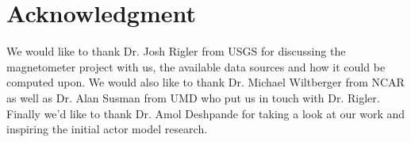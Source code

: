 \documentclass[conference]{IEEEtran}
\begin{document}
\section*{Acknowledgment}
We would like to thank Dr. Josh Rigler from USGS for discussing the magnetometer project with us, the available data sources and how it could be computed upon. We would also like to thank Dr. Michael Wiltberger from NCAR as well as Dr. Alan Susman from UMD who put us in touch with Dr. Rigler. Finally we'd like to thank Dr. Amol Deshpande for taking a look at our work and inspiring the initial actor model research.






\end{document}
